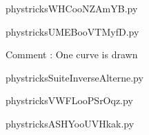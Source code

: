     

    \clearpage
    


    \newcommand{\CaptionFigWHCooNZAmYB}{<+Type your caption here+>}
    \begin{center}
        
    \end{center}
    phystricksWHCooNZAmYB.py

    

    \clearpage
    


    \newcommand{\CaptionFigUMEBooVTMyfD}{<+Type your caption here+>}
    \begin{center}
        
    \end{center}
    phystricksUMEBooVTMyfD.py

    Comment : One curve is drawn

    \clearpage
    


    \newcommand{\CaptionFigSuiteInverseAlterne}{<+Type your caption here+>}
    \begin{center}
        
    \end{center}
    phystricksSuiteInverseAlterne.py

    

    \clearpage
    


    \newcommand{\CaptionFigVWFLooPSrOqz}{<+Type your caption here+>}
    \begin{center}
        
    \end{center}
    phystricksVWFLooPSrOqz.py

    

    \clearpage
    


    \newcommand{\CaptionFigASHYooUVHkak}{<+Type your caption here+>}
    \begin{center}
        
    \end{center}
    phystricksASHYooUVHkak.py

    

    \clearpage
    

